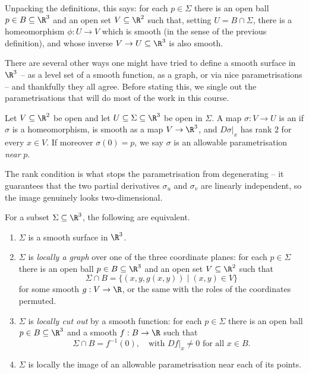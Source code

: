 Unpacking the definitions, this says: for each $p \in \Sigma$ there is an open ball $p \in B \subseteq \R^3$ and an open set $V \subseteq \R^2$ such that, setting $U = B \cap \Sigma$, there is a homeomorphism $\phi: U \rightarrow V$ which is smooth (in the sense of the previous definition), and whose inverse $V \rightarrow U \subseteq \R^3$ is also smooth.

There are several other ways one might have tried to define a smooth surface in $\R^3$ -- as a level set of a smooth function, as a graph, or via nice parametrisations -- and thankfully they all agree. Before stating this, we single out the parametrisations that will do most of the work in this course.

\begin{definition}
    Let $V \subseteq \R^2$ be open and let $U \subseteq \Sigma \subseteq \R^3$ be open in $\Sigma$. A map $\sigma: V \rightarrow U$ is an  if $\sigma$ is a homeomorphism, is smooth as a map $V \rightarrow \R^3$, and $\left.D\sigma\right|_x$ has rank $2$ for every $x \in V$.
    If moreover $\sigma(0) = p$, we say $\sigma$ is an allowable parametrisation \emph{near} $p$.
\end{definition}

The rank condition is what stops the parametrisation from degenerating -- it guarantees that the two partial derivatives $\sigma_u$ and $\sigma_v$ are linearly independent, so the image genuinely looks two-dimensional.

\begin{theorem}\label{thm:smoothsurfacechar}
    For a subset $\Sigma \subseteq \R^3$, the following are equivalent.
    \begin{enumerate}[label=(\roman*)]
        \item $\Sigma$ is a smooth surface in $\R^3$.
        \item $\Sigma$ is \emph{locally a graph} over one of the three coordinate planes: for each $p \in \Sigma$ there is an open ball $p \in B \subseteq \R^3$ and an open set $V \subseteq \R^2$ such that
        $$
        \Sigma \cap B = \{(x, y, g(x, y)) \mid (x,y) \in V\}
        $$
        for some smooth $g : V \rightarrow \R$, or the same with the roles of the coordinates permuted.
        \item $\Sigma$ is \emph{locally cut out} by a smooth function: for each $p \in \Sigma$ there is an open ball $p \in B \subseteq \R^3$ and a smooth $f: B \rightarrow \R$ such that
        $$
        \Sigma \cap B = f^{-1}(0), \quad \text{with } \left.Df\right|_x \neq 0 \text{ for all } x \in B.
        $$
        \item $\Sigma$ is locally the image of an allowable parametrisation near each of its points.
    \end{enumerate}
\end{theorem}

